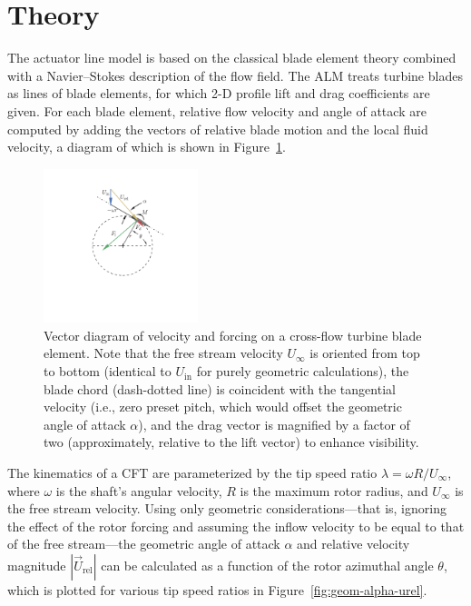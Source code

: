 \documentclass[times]{weauth}
\begin{document}
\section{Theory}

The actuator line model is based on the classical blade element theory combined
with a Navier--Stokes description of the flow field. The ALM treats turbine
blades as lines of blade elements, for which 2-D profile lift and drag
coefficients are given. For each blade element, relative flow velocity and angle
of attack are computed by adding the vectors of relative blade motion and the
local fluid velocity, a diagram of which is shown in Figure~\ref{fig:vectors}.

\begin{figure}
    \centering

    \includegraphics[clip, trim=1in 1.5in 1in 0.5in,
    width=0.4\textwidth]{figures/CFT-vectors_cft-vectors}

    \caption{Vector diagram of velocity and forcing on a cross-flow turbine
    blade element. Note that the free stream velocity $U_\infty$ is oriented
    from top to bottom (identical to $U_{\mathrm{in}}$ for purely geometric
    calculations), the blade chord (dash-dotted line) is coincident with the
    tangential velocity (i.e., zero preset pitch, which would offset the
    geometric angle of attack $\alpha$), and the drag vector is magnified by a
    factor of two (approximately, relative to the lift vector) to enhance
    visibility.}

    \label{fig:vectors}
\end{figure}

The kinematics of a CFT are parameterized by the tip speed ratio $\lambda =
\omega R/U_\infty$, where $\omega$ is the shaft's angular velocity, $R$ is the
maximum rotor radius, and $U_\infty$ is the free stream velocity. Using only
geometric considerations---that is, ignoring the effect of the rotor forcing and
assuming the inflow velocity to be equal to that of the free stream---the
geometric angle of attack $\alpha$ and relative velocity magnitude
$|\vec{U}_{\mathrm{rel}}|$ can be calculated as a function of the rotor
azimuthal angle $\theta$, which is plotted for various tip speed ratios in
Figure~\ref{fig:geom-alpha-urel}.
\end{document}
